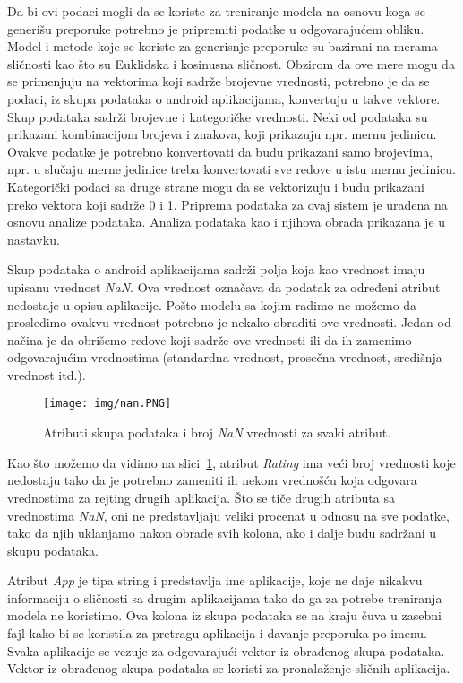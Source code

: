 \documentclass[a4paper,12pt,titlepage]{article}
\begin{document}
Da bi ovi podaci mogli da se koriste za treniranje modela na osnovu koga se generišu preporuke potrebno je pripremiti podatke u odgovarajućem obliku. Model i metode koje se koriste za generisnje preporuke su bazirani na merama sličnosti kao što su Euklidska i kosinusna sličnost. Obzirom da ove mere mogu da se primenjuju na vektorima koji sadrže brojevne vrednosti, potrebno je da se podaci, iz skupa podataka o android aplikacijama, konvertuju u takve vektore. Skup podataka sadrži brojevne i kategoričke vrednosti. Neki od podataka su prikazani kombinacijom brojeva i znakova, koji prikazuju npr. mernu jedinicu. Ovakve podatke je potrebno konvertovati da budu prikazani samo brojevima, npr. u slučaju merne jedinice treba konvertovati sve redove u istu mernu jedinicu. Kategorički podaci sa druge strane mogu da se vektorizuju i budu prikazani preko vektora koji sadrže 0 i 1. Priprema podataka za ovaj sistem je urađena na osnovu analize podataka. Analiza podataka kao i njihova obrada prikazana je u nastavku.

Skup podataka o android aplikacijama sadrži polja koja kao vrednost imaju upisanu vrednost \emph{NaN}. Ova vrednost označava da podatak za određeni atribut nedostaje u opisu aplikacije. Pošto modelu sa kojim radimo ne možemo da prosledimo ovakvu vrednost potrebno je nekako obraditi ove vrednosti. Jedan od načina je da obrišemo redove koji sadrže ove vrednosti ili da ih zamenimo odgovarajućim vrednostima (standardna vrednost, prosečna vrednost, središnja vrednost itd.).

\begin{figure}[ht!]
\centering
\texttt{[image: img/nan.PNG]}
\caption{Atributi skupa podataka i broj \emph{NaN} vrednosti za svaki atribut.}
\label{nan}
\end{figure} 

Kao što možemo da vidimo na slici~\ref{nan}, atribut \emph{Rating} ima veći broj vrednosti koje nedostaju tako da je potrebno zameniti ih nekom vrednošću koja odgovara vrednostima za rejting drugih aplikacija. Što se tiče drugih atributa sa vrednostima \emph{NaN}, oni ne predstavljaju veliki procenat u odnosu na sve podatke, tako da njih uklanjamo nakon obrade svih kolona, ako i dalje budu sadržani u skupu podataka. 

Atribut \emph{App} je tipa string i predstavlja ime aplikacije, koje ne daje nikakvu informaciju o sličnosti sa drugim aplikacijama tako da ga za potrebe treniranja modela ne koristimo. Ova kolona iz skupa podataka se na kraju čuva u zasebni fajl kako bi se koristila za pretragu aplikacija i davanje preporuka po imenu. Svaka aplikacije se vezuje za odgovarajući vektor iz obrađenog skupa podataka. Vektor iz obrađenog skupa podataka se koristi za pronalaženje sličnih aplikacija.
\end{document}
